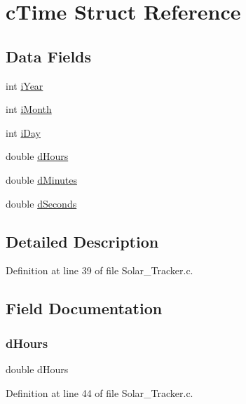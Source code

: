 \hypertarget{structc_time}{}\section{c\+Time Struct Reference}
\label{structc_time}
\subsection*{Data Fields}
\begin{DoxyCompactItemize}
\item 
int \hyperlink{structc_time_aff44b11da9adef57c6766912ab82bf7d}{i\+Year}
\item 
int \hyperlink{structc_time_a911b960ed333938ce939488afab15121}{i\+Month}
\item 
int \hyperlink{structc_time_a30a53332a9eaa6d190792a94928b8e0b}{i\+Day}
\item 
double \hyperlink{structc_time_ab7a7f5d3981d0f6d2f96c75b83ba819e}{d\+Hours}
\item 
double \hyperlink{structc_time_a933c5a4e61d12a5a0b6d2ef654fc5f55}{d\+Minutes}
\item 
double \hyperlink{structc_time_ac79c811f4c4df0809def02bfd4ff5b4d}{d\+Seconds}
\end{DoxyCompactItemize}


\subsection{Detailed Description}


Definition at line 39 of file Solar\+\_\+\+Tracker.\+c.



\subsection{Field Documentation}
\mbox{\label{structc_time_ab7a7f5d3981d0f6d2f96c75b83ba819e}} 
\subsubsection{\texorpdfstring{d\+Hours}{dHours}}
{\footnotesize\ttfamily double d\+Hours}



Definition at line 44 of file Solar\+\_\+\+Tracker.\+c.

\mbox{\label{structc_time_a933c5a4e61d12a5a0b6d2ef654fc5f55}} 
